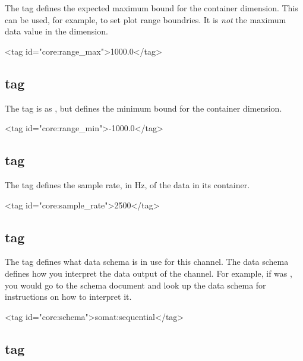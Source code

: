 \documentclass{article}
\begin{document}
The  tag defines the expected maximum bound for
the container dimension.  This can be used, for example, to set plot
range boundries.  It is \emph{not} the maximum data value in the
dimension.

\begin{siexmlexample}
<tag id="core:range_max">1000.0</tag>
\end{siexmlexample}

\subsection{ tag}

The  tag is as , but defines
the minimum bound for the container dimension.

\begin{siexmlexample}
<tag id="core:range_min">-1000.0</tag>
\end{siexmlexample}

\subsection{ tag}

The  tag defines the sample rate, in Hz, of the
data in its container.

\begin{siexmlexample}
<tag id="core:sample_rate">2500</tag>
\end{siexmlexample}

\subsection{ tag}

The  tag defines what data schema is in use for this
channel.  The data schema defines how you interpret the data output of
the channel.  For example, if  was
, you would go to the  schema
document and look up the  data schema for instructions
on how to interpret it.

\begin{siexmlexample}
<tag id="core:schema">somat:sequential</tag>
\end{siexmlexample}

\subsection{ tag}
\end{document}
